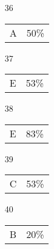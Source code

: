 \documentclass[12pt]{article}
\begin{document}
\begin{multicols}{5}
\begin{enumerate}
\item[]
\item[36] \begin{tabular}{cc} A & 50\%\end{tabular}
\item[37] \begin{tabular}{cc} E & 53\%\end{tabular}
\item[38] \begin{tabular}{cc} E & 83\%\end{tabular}
\item[39] \begin{tabular}{cc} C & 53\%\end{tabular}
\item[40] \begin{tabular}{cc} B & 20\%\end{tabular}

\item[]


\end{enumerate}
\end{multicols}
\end{document}
